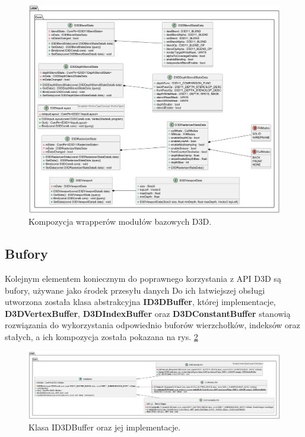 	\begin{figure}[h!]
		\centering
		\includegraphics[width=\textwidth]{images/UML/d3dutils.png}
		\caption{Kompozycja wrapperów modułów bazowych D3D.}
		\label{UML_D3DUtils}
	\end{figure}
	
	\vfill
	\clearpage
	
\subsection{Bufory}
	Kolejnym elementem koniecznym do poprawnego korzystania z API D3D są bufory, używane jako środek przesyłu danych 
	Do ich łatwiejszej obsługi utworzona została klasa abstrakcyjna \textbf{ID3DBuffer}, której implementacje, \textbf{D3DVertexBuffer}, \textbf{D3DIndexBuffer} oraz \textbf{D3DConstantBuffer} stanowią rozwiązania do wykorzystania odpowiednio buforów wierzchołków, indeksów oraz stałych, a ich kompozycja została pokazana na rys. \ref{UML_Buffer}
	
		
	\begin{figure}[h!]
		\centering
		\includegraphics[width=\textwidth]{images/UML/buffer.png}
		\caption{Klasa ID3DBuffer oraz jej implementacje.}
		\label{UML_Buffer}
	\end{figure}
	
